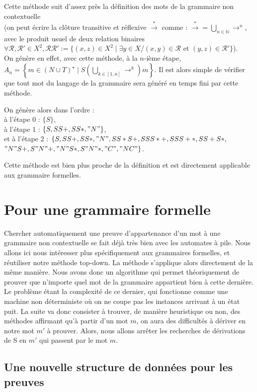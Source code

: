 \documentclass[a4paper,10pt
]{article}
\begin{document}
Cette méthode suit d'assez près la définition des mots de la grammaire non contextuelle\\
(on peut écrire la clôture transitive et réflexive $\overset{*}{\rightarrow}$ comme :
$\overset{*}{\rightarrow} = \bigcup_{n \in \mathbb{N}} \rightarrow ^n$, avec le produit usuel de deux relation binaires $\forall \mathcal{R}, \mathcal{R}' \in X^2, \mathcal{R} \mathcal{R'} := \{(x,z) \in X^2 \mid \exists y \in X / (x,y) \in \mathcal{R} \text{ et } (y,z) \in \mathcal{R}'\} $).\\
On génère en effet, avec cette méthode, à la $n$-ième étape, $A_n = \left\{m \in (N \cup T)^\star \mid  S \left(\bigcup_{k \in [1,n]} \rightarrow^k\right) m\right\}$.
Il est alors simple de vérifier que tout mot du langage de la grammaire sera généré en temps fini par cette méthode.

On génère alors dans l'ordre :\\
à l'étape 0 : $\{S\}$, \\
à l'étape 1 : $\{S,SS+,SS*,"N"\}$,\\
et à l'étape 2 : $\{S,SS+,SS*,"N",SS*S+,SSS*+,SSS+*,SS+S*,$ \\
$"N"S+,S"N"+,"N"S*,S"N"*,"C","NC"\}$.

Cette méthode est bien plus proche de la définition et est directement applicable aux grammaire formelles.

\section{Pour une grammaire formelle}

Chercher automatiquement une preuve d'appartenance d'un mot à une grammaire non contextuelle se fait déjà très bien avec les automates à pile.
Nous allons ici nous intéresser plus spécifiquement aux grammaires formelles, et réutiliser notre méthode top-down.
La méthode s'applique alors directement de la même manière.
Nous avons donc un algorithme qui permet théoriquement de prouver que n'importe quel mot de la grammaire appartient bien à cette dernière.
Le problème étant la complexité de ce dernier, qui fonctionne comme une machine non déterministe où on ne coupe pas les instances arrivant à un état puit.
La suite va donc consister à trouver, de manière heuristique ou non, des méthodes affirmant qu'à partir d'un mot $m$, on aura des difficultés à dériver en notre mot $m'$ à prouver.
Alors, nous allons arrêter les recherches de dérivations de S en $m'$ qui passent par le mot $m$.

\subsection{Une nouvelle structure de données pour les preuves}
\end{document}
